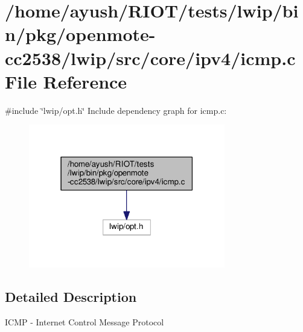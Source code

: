 \hypertarget{openmote-cc2538_2lwip_2src_2core_2ipv4_2icmp_8c}{}\section{/home/ayush/\+R\+I\+O\+T/tests/lwip/bin/pkg/openmote-\/cc2538/lwip/src/core/ipv4/icmp.c File Reference}
\label{openmote-cc2538_2lwip_2src_2core_2ipv4_2icmp_8c}
{\ttfamily \#include \char`\"{}lwip/opt.\+h\char`\"{}}\newline
Include dependency graph for icmp.\+c\+:
\nopagebreak
\begin{figure}[H]
\begin{center}
\leavevmode
\includegraphics[width=243pt]{openmote-cc2538_2lwip_2src_2core_2ipv4_2icmp_8c__incl}
\end{center}
\end{figure}


\subsection{Detailed Description}
I\+C\+MP -\/ Internet Control Message Protocol 